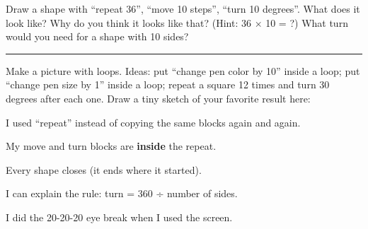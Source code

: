 \begin{challenge}
Draw a shape with \enquote{repeat 36}, \enquote{move 10 steps}, \enquote{turn 10 degrees}. What does it look like? Why do you think it looks like that? (Hint: 36 × 10 = ?)
What turn would you need for a shape with 10 sides? \rule{2cm}{0.4pt}
\end{challenge}

\begin{creative}
Make a picture with loops. Ideas: put \enquote{change pen color by 10} inside a loop; put \enquote{change pen size by 1} inside a loop; repeat a square 12 times and turn 30 degrees after each one. Draw a tiny sketch of your favorite result here:
\answerspace{3cm}
\end{creative}

\begin{selfcheck}
  \item I used \enquote{repeat} instead of copying the same blocks again and again.
  \item My move and turn blocks are \textbf{inside} the repeat.
  \item Every shape closes (it ends where it started).
  \item I can explain the rule: turn = 360 ÷ number of sides.
  \item I did the 20-20-20 eye break when I used the screen.
\end{selfcheck}
